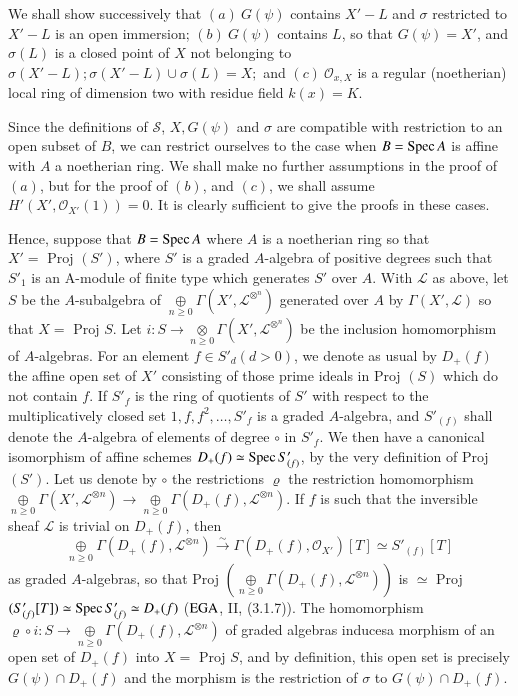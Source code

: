 We shall show successively that $(a)~ G(\psi)$ contains $X' - L$ and
$\sigma$ restricted to $X' - L$ is an open immersion; $(b)~ G(\psi)$
contains $L$, so that $G(\psi) = X'$, and $\sigma(L)$ is a closed
point of $X$ not belonging to $\sigma(X' - L); \sigma(X' -
L)\cup\sigma(L) = X;$ and $(c) ~\mathscr{O}_{x,X}$ is a regular
(noetherian) local ring of dimension two with residue field $k(x) =
K$. 

Since the definitions of $\mathscr{S}$, $X,G(\psi)$ and $\sigma$ are
compatible with restriction to an open subset of $B$, we can restrict
ourselves to the case when $B = \operatorname{Spec} A$ is affine with $A$ a
noetherian ring. We shall make no further assumptions in the proof of
$(a)$, but for the proof of $(b)$, and $(c)$, we shall assume
$H'(X',\mathscr{O}_{X'}(1)) = 0$. It is clearly\pageoriginale
sufficient to give the proofs in these cases. 

Hence, suppose that $B = \operatorname{Spec} A$ where $A$ is a noetherian ring so
that $X' = \text { Proj } (S')$, where $S'$ is a graded $A$-algebra of
positive degrees such that $S'_1$ is an A-module of finite type which
generates $S'$ over $A$. With $\mathscr{L}$ as above, let $S$ be the
$A$-subalgebra of $\underset{n\geq
  0}{\oplus}\Gamma(X',\mathscr{L}^{\otimes^{n}})$ generated over $A$ by
$\Gamma(X',\mathscr{L})$ so that $X = \text { Proj } S$. Let
$i:S\rightarrow  \underset{n\geq
  0}{\otimes}\Gamma(X',\mathscr{L}^{\otimes^{n}})$ be the inclusion
homomorphism of $A$-algebras. For an element $f \in S'_{d}(d>0)$, we
denote as usual by $D_+(f)$ the affine open set of $X'$ consisting of
those prime ideals in Proj $(S)$ which do not contain $f$. If $S'_f$
is the ring of quotients of $S'$ with respect to the multiplicatively
closed set $1,f,f^2,\ldots,S'_f$ is a graded $A$-algebra, and
$S'_{(f)}$ shall denote the $A$-algebra of elements of degree $\circ$
in $S'_f$. We 
then have a canonical isomorphism of affine schemes $D_+(f)\simeq
\operatorname{Spec} S'_{(f)}$, by the very definition of Proj $(S')$. Let us denote
by $\circ$ the restrictions $\varrho$ the restriction homomorphism
$\underset{n\geq 0}{\oplus}\Gamma(X',\mathscr{L}^{\otimes
  n})\rightarrow \underset{n\geq
  0}{\oplus}\Gamma(D_+(f),\mathscr{L}^{\otimes n})$. If $f$ is such
that the inversible sheaf $\mathscr{L}$ is trivial on $D_+(f)$, then
$$
\underset{n\geq 0}{\oplus}\Gamma(D_+(f),\mathscr{L}^{\otimes
  n}) \overset{\sim}{\rightarrow} \Gamma (D_+(f), \mathscr{O}_{X'})[T]\simeq
S'_{(f)}[T] 
$$
 as graded $A$-algebras, so that Proj $(\underset{n\geq
  0}{\oplus}\Gamma(D_+ (f),\mathscr{L}^{\otimes n}))$ is $\simeq$ Proj
$(S'_{(f)}\break[T]) \simeq  \Spec  S'_{(f)}\simeq D_+(f)$
($\operatorname{EGA}$, II, (3.1.7)). The homomorphism $\varrho \circ i:S \rightarrow
\underset{n\geq 0} {\oplus} \Gamma(D_+(f),\mathscr{L}^{\otimes n})$ of
graded algebras induces\pageoriginale a morphism of an open set of
$D_+(f)$ into $X =$ Proj  $S$, and by definition, this open set is precisely
$G(\psi)\cap D_+(f)$ and the morphism is the restriction of $\sigma $
to $G(\psi)\cap D_+(f)$.  

